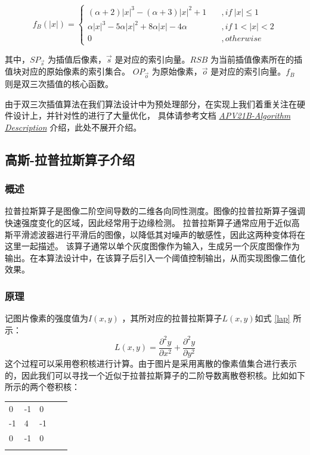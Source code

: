 \documentclass[12pt, a4paper, oneside]{ctexbook}
\begin{document}
	\begin{equation}
		f_B(|x|)=
		\begin{cases}
			(\alpha + 2)|x|^3-(\alpha+3)|x|^2+1\quad &,if\ |x| \leq1\\
			\alpha|x|^3-5\alpha|x|^2+8\alpha|x|-4\alpha\quad&,if \ 1<|x|<2\\
			0&,otherwise				
			\label{bicubic_2}
		\end{cases}
	\end{equation}
	\par
	其中，$SP_{\vec{s}}$ 为插值后像素，$\vec{s}$ 是对应的索引向量。$RSB$ 为当前插值像素所在的插值块对应的原始像素的索引集合。
	$OP_{\vec{o}}$ 为原始像素，$\vec{o}$ 是对应的索引向量。$f_B$ 则是双三次插值的核心函数。
	\par 由于双三次插值算法在我们算法设计中为预处理部分，在实现上我们着重关注在硬件设计上，并针对性的进行了大量优化，
	具体请参考文档 \href{./ref/APV21B_Algorithm_Description.pdf}{\textit{APV21B-Algorithm Description}} 介绍，此处不展开介绍。
	
	\subsection{高斯-拉普拉斯算子介绍}
	\subsubsection{概述}
	拉普拉斯算子是图像二阶空间导数的二维各向同性测度。图像的拉普拉斯算子强调快速强度变化的区域，因此经常用于边缘检测。
	拉普拉斯算子通常应用于近似高斯平滑滤波器进行平滑后的图像，以降低其对噪声的敏感性，因此这两种变体将在这里一起描述。
	该算子通常以单个灰度图像作为输入，生成另一个灰度图像作为输出。在本算法设计中，在该算子后引入一个阈值控制输出，从而实现图像二值化效果。
	\subsubsection{原理}
	记图片像素的强度值为$I(x,y)$ ，其所对应的拉普拉斯算子$L(x,y)$如式 \ref{lap} 所示：
	\begin{equation}	\label{lap}
		L(x,y)=\frac{\partial ^2 y}{\partial x^2} + \frac{\partial ^2 y}{\partial y^2}
	\end{equation}
	这个过程可以采用卷积核进行计算。由于图片是采用离散的像素值集合进行表示的，因此我们可以寻找一个近似于拉普拉斯算子的二阶导数离散卷积核。比如如下所示的两个卷积核：
	\begin{table}[h]
		\centering
		\begin{tabular}{lllll}
			\cline{1-3}
			\multicolumn{1}{|l|}{0}  & \multicolumn{1}{l|}{-1} & \multicolumn{1}{l|}{0}  &  &  \\ \cline{1-3}
			\multicolumn{1}{|l|}{-1} & \multicolumn{1}{l|}{4}  & \multicolumn{1}{l|}{-1} &  &  \\ \cline{1-3}
			\multicolumn{1}{|l|}{0}  & \multicolumn{1}{l|}{-1} & \multicolumn{1}{l|}{0}  &  &  \\ \cline{1-3}
			&                         &                         &  & 
		\end{tabular}
	\end{table}
	
\end{document}
